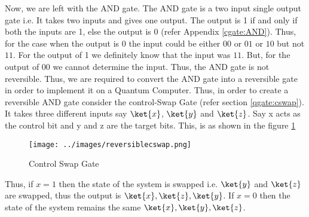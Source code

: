 \documentclass[12pt, oneside]{book}
\theoremstyle{definition}
\theoremstyle{definition}
\theoremstyle{remark}
\begin{document}
Now, we are left with the AND gate. The AND gate is a two input single output gate i.e. It takes two inputs and gives one output. The output is 1 if and only if both the inputs are 1, else the output is 0 (refer Appendix \ref{cgate:AND}).
Thus, for the case when the output is 0 the input could be either $00$ or $01$ or $10$ but not $11$. For the output of 1 we definitely know that the input was $11$. 
But, for the output of $00$ we cannot determine the input. Thus, the AND gate is not reversible. Thus, we are required to convert the AND gate into a reversible gate in order to implement it on a Quantum Computer.
Thus, in order to create a reversible AND gate consider the control-Swap Gate (refer section \ref{qgate:cswap}). It takes three different inputs say
$\ket{x}$, $\ket{y}$ and $\ket{z}$. Say x acts as the control bit and y and z are the target bits. 
This, is as shown in the figure \ref{fig:cswap}
\begin{figure}[H]
    \centering
    \texttt{[image: ../images/reversiblecswap.png]}
    \caption{Control Swap Gate}
    \label{fig:cswap}
\end{figure}
Thus, if 
$x=1$ then the state of the system is swapped i.e. $\ket{y}$ and $\ket{z}$ are swapped, thus the output is $\ket{x},\ket{z},\ket{y}$. If $x=0$ then the state of the system remains the same $\ket{x},\ket{y},\ket{z}$.
\end{document}
